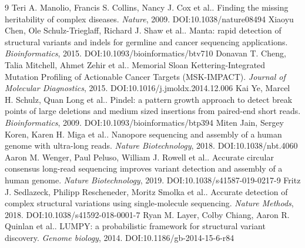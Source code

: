 \documentclass[11pt]{article}
\begin{document}
\begin{thebibliography}{9}
 Teri A. Manolio, Francis S. Collins, Nancy J. Cox et al.. Finding the missing heritability of complex diseases. \emph{Nature}, 2009. DOI:10.1038/nature08494
 Xiaoyu Chen, Ole Schulz-Trieglaff, Richard J. Shaw et al.. Manta: rapid detection of structural variants and indels for germline and cancer sequencing applications. \emph{Bioinformatics}, 2015. DOI:10.1093/bioinformatics/btv710
 Donavan T. Cheng, Talia Mitchell, Ahmet Zehir et al.. Memorial Sloan Kettering-Integrated Mutation Profiling of Actionable Cancer Targets (MSK-IMPACT). \emph{Journal of Molecular Diagnostics}, 2015. DOI:10.1016/j.jmoldx.2014.12.006
 Kai Ye, Marcel H. Schulz, Quan Long et al.. Pindel: a pattern growth approach to detect break points of large deletions and medium sized insertions from paired-end short reads. \emph{Bioinformatics}, 2009. DOI:10.1093/bioinformatics/btp394
 Miten Jain, Sergey Koren, Karen H. Miga et al.. Nanopore sequencing and assembly of a human genome with ultra-long reads. \emph{Nature Biotechnology}, 2018. DOI:10.1038/nbt.4060
 Aaron M. Wenger, Paul Peluso, William J. Rowell et al.. Accurate circular consensus long-read sequencing improves variant detection and assembly of a human genome. \emph{Nature Biotechnology}, 2019. DOI:10.1038/s41587-019-0217-9
 Fritz J. Sedlazeck, Philipp Rescheneder, Moritz Smolka et al.. Accurate detection of complex structural variations using single-molecule sequencing. \emph{Nature Methods}, 2018. DOI:10.1038/s41592-018-0001-7
 Ryan M. Layer, Colby Chiang, Aaron R. Quinlan et al.. LUMPY: a probabilistic framework for structural variant discovery. \emph{Genome biology}, 2014. DOI:10.1186/gb-2014-15-6-r84
\end{thebibliography}
\end{document}
